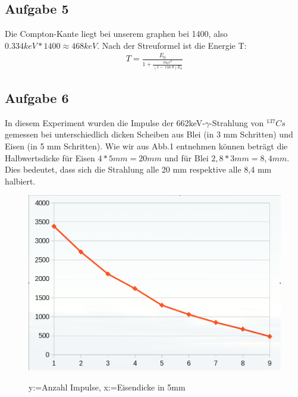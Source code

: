 \documentclass[11pt,a4paper]{article}
\begin{document}
  \subsection{Aufgabe 5}
   Die Compton-Kante liegt bei unserem graphen bei 1400, also $0.334keV * 1400 \approx 468keV$.
   Nach der Streuformel ist die Energie T:
    \begin{align}
     T=\frac{{E}_{0}}{1+\frac{{m}_{0}c^{2}}{(1-\cos\theta){E}_{0}}}
     \end{align}
  \subsection{Aufgabe 6}
   In diesem Experiment wurden die Impulse der 662keV-$\gamma$-Strahlung von $^{137}{Cs}$ gemessen
   bei unterschiedlich dicken Scheiben aus Blei (in 3 mm Schritten) und Eisen (in 5 mm Schritten).
   Wie wir aus Abb.1 entnehmen k\"onnen betr\"agt die Halbwertsdicke f\"ur Eisen $4*5mm=20mm$ und 
   f\"ur Blei $2,8*3 mm = 8,4 mm$. Dies bedeutet, dass sich die Strahlung alle 20 mm respektive alle
   8,4 mm halbiert.\\
   \begin{figure}
       \caption{y:=Anzahl Impulse, x:=Eisendicke in 5mm}
       \centering
       \includegraphics[scale=0.5]{Bilder/eisen.png} \\
   \end{figure}
\end{document}
